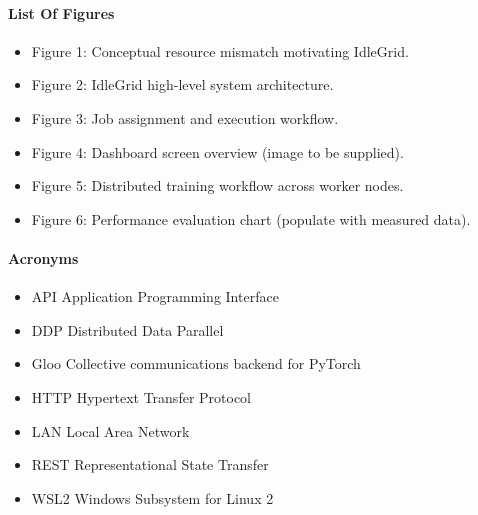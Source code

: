 \documentclass{article}
\begin{document}
	\pagebreak
	
	
	\renewcommand{\contentsname}{\textbf{Table Of Contents} }
	\renewcommand{\cfttoctitlefont}{\huge}
	\tableofcontents\thispagestyle{fancy}
	\setlength{\parindent}{4em}
	\setlength{\parskip}{1em}
	\renewcommand{\baselinestretch}{2.0}
	
	\paragraph{List Of Figures}
	\begin{itemize}
		\item Figure 1: Conceptual resource mismatch motivating IdleGrid.
		\item Figure 2: IdleGrid high-level system architecture.
		\item Figure 3: Job assignment and execution workflow.
		\item Figure 4: Dashboard screen overview (image to be supplied).
		\item Figure 5: Distributed training workflow across worker nodes.
		\item Figure 6: Performance evaluation chart (populate with measured data).
	\end{itemize}
	\paragraph{Acronyms}
	\begin{itemize}
		\item API \hspace{5em}Application Programming Interface
		\item DDP \hspace{5em}Distributed Data Parallel
		\item Gloo \hspace{5em}Collective communications backend for PyTorch
		\item HTTP \hspace{5em}Hypertext Transfer Protocol
		\item LAN \hspace{5em}Local Area Network
		\item REST \hspace{5em}Representational State Transfer
		\item WSL2 \hspace{5em}Windows Subsystem for Linux 2
		
	\end{itemize}
		
\end{document}
